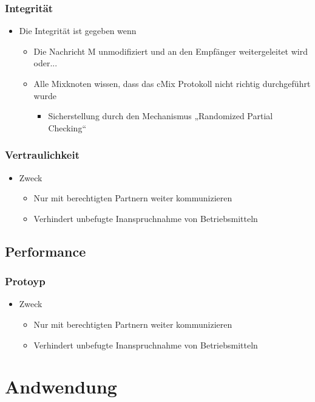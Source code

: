 \documentclass[t, xcolor=dvipsnames]{beamer}
\begin{document}
\begin{frame}
	\frametitle{Integrität}
	\begin{itemize}
		\item Die Integrität ist gegeben wenn
			\begin{itemize}
				\item Die Nachricht M unmodifiziert und an den Empfänger weitergeleitet wird oder...
				\item Alle Mixknoten wissen, dass das cMix Protokoll nicht richtig durchgeführt wurde
					\begin{itemize}
						\item Sicherstellung durch den Mechanismus „Randomized Partial Checking“
					\end{itemize}
			\end{itemize}
	\end{itemize}
	\vspace{\fill}
\end{frame}

\begin{frame}
	\frametitle{Vertraulichkeit}
	\begin{itemize}
		\item Zweck
			\begin{itemize}
				\item Nur mit \alert{berechtigten Partnern} weiter kommunizieren
				\item Verhindert unbefugte Inanspruchnahme von Betriebsmitteln
			\end{itemize}
	\end{itemize}
	\vspace{\fill}
\end{frame}
\subsection{Performance}
\begin{frame}
	\frametitle{Protoyp}
	\begin{itemize}
		\item Zweck
			\begin{itemize}
				\item Nur mit \alert{berechtigten Partnern} weiter kommunizieren
				\item Verhindert unbefugte Inanspruchnahme von Betriebsmitteln
			\end{itemize}
	\end{itemize}
	\vspace{\fill}
\end{frame}
\section{Andwendung}
\end{document}
